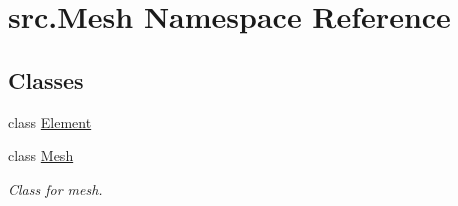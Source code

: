 \hypertarget{namespacesrc_1_1_mesh}{\section{src.\-Mesh Namespace Reference}
\label{namespacesrc_1_1_mesh}
}
\subsection*{Classes}
\begin{DoxyCompactItemize}
\item 
class \hyperlink{classsrc_1_1_mesh_1_1_element}{Element}
\item 
class \hyperlink{classsrc_1_1_mesh_1_1_mesh}{Mesh}
\begin{DoxyCompactList}\small\item\em Class for mesh. \end{DoxyCompactList}\end{DoxyCompactItemize}
